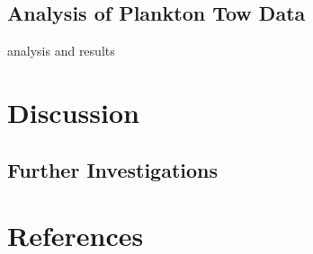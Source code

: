 \documentclass[12pt]{article}\usepackage[]{graphicx}\usepackage[]{color}
\begin{document}
\subsection{Analysis of Plankton Tow Data}

analysis and results 

\section{Discussion}

\subsection{Further Investigations}

\nocite{*}

\newpage
\section{References}

\begingroup
\renewcommand{\section}[2]{}%
\begin{flushleft}

%
%
%
%

\end{flushleft}
\endgroup

\newpage
\section{Appendix - R Code}

\singlespacing
\end{document}
